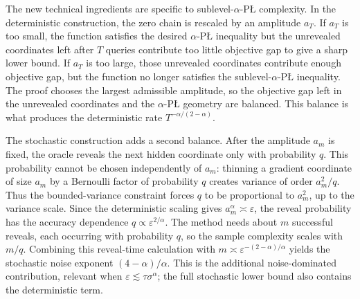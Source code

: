 \documentclass[11pt]{article}
\begin{document}
The new technical ingredients are specific to sublevel-\(\alpha\)-P\L{} complexity. In the deterministic construction,
the zero chain is rescaled by an amplitude \(a_T\). If \(a_T\) is too small, the function satisfies the desired
\(\alpha\)-P\L{} inequality but the unrevealed coordinates left after \(T\) queries contribute too little objective gap to
give a sharp lower bound. If \(a_T\) is too large, those unrevealed coordinates contribute enough objective gap, but the
function no longer satisfies the sublevel-\(\alpha\)-P\L{} inequality. The proof chooses the largest admissible amplitude,
so the objective gap left in the unrevealed coordinates and the \(\alpha\)-P\L{} geometry are balanced. This balance is what produces the deterministic rate
\(T^{-\alpha/(2-\alpha)}\).

The stochastic construction adds a second balance. After the amplitude \(a_m\) is fixed, the oracle reveals the next
hidden coordinate only with probability \(q\). This probability cannot be chosen independently of \(a_m\): thinning a
gradient coordinate of size \(a_m\) by a Bernoulli factor of probability \(q\) creates variance of order \(a_m^2/q\).
Thus the bounded-variance constraint forces \(q\) to be proportional to \(a_m^2\), up to the variance scale. %
Since the deterministic scaling gives
\(a_m^\alpha\asymp\varepsilon\), the reveal probability has the accuracy dependence
\(q\propto\varepsilon^{2/\alpha}\). The method needs about \(m\) successful reveals, each occurring with probability
\(q\), so the sample complexity scales with \(m/q\). Combining this reveal-time calculation with
\(m\asymp\varepsilon^{-(2-\alpha)/\alpha}\) yields the stochastic noise exponent \((4-\alpha)/\alpha\). This is the
additional noise-dominated contribution, relevant when \(\varepsilon\lesssim\tau\sigma^\alpha\); the full stochastic
lower bound also contains the deterministic term.
\end{document}
